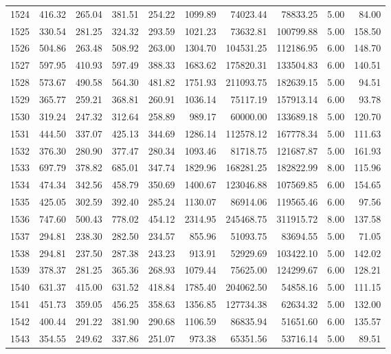 \begin{tabular}{lrrrrrrrrr}
1524 & 416.32 & 265.04 & 381.51 & 254.22 & 1099.89 & 74023.44 & 78833.25 & 5.00 & 84.00 \\
1525 & 330.54 & 281.25 & 324.32 & 293.59 & 1021.23 & 73632.81 & 100799.88 & 5.00 & 158.50 \\
1526 & 504.86 & 263.48 & 508.92 & 263.00 & 1304.70 & 104531.25 & 112186.95 & 6.00 & 148.70 \\
1527 & 597.95 & 410.93 & 597.49 & 388.33 & 1683.62 & 175820.31 & 133504.83 & 6.00 & 140.51 \\
1528 & 573.67 & 490.58 & 564.30 & 481.82 & 1751.93 & 211093.75 & 182639.15 & 5.00 & 94.51 \\
1529 & 365.77 & 259.21 & 368.81 & 260.91 & 1036.14 & 75117.19 & 157913.14 & 6.00 & 93.78 \\
1530 & 319.24 & 247.32 & 312.64 & 258.89 & 989.17 & 60000.00 & 133689.18 & 5.00 & 120.70 \\
1531 & 444.50 & 337.07 & 425.13 & 344.69 & 1286.14 & 112578.12 & 167778.34 & 5.00 & 111.63 \\
1532 & 376.30 & 280.90 & 377.47 & 280.34 & 1093.46 & 81718.75 & 121687.87 & 5.00 & 161.93 \\
1533 & 697.79 & 378.82 & 685.01 & 347.74 & 1829.96 & 168281.25 & 182822.99 & 8.00 & 115.96 \\
1534 & 474.34 & 342.56 & 458.79 & 350.69 & 1400.67 & 123046.88 & 107569.85 & 6.00 & 154.65 \\
1535 & 425.05 & 302.59 & 392.40 & 285.24 & 1130.07 & 86914.06 & 119565.46 & 6.00 & 97.56 \\
1536 & 747.60 & 500.43 & 778.02 & 454.12 & 2314.95 & 245468.75 & 311915.72 & 8.00 & 137.58 \\
1537 & 294.81 & 238.30 & 282.50 & 234.57 & 855.96 & 51093.75 & 83694.55 & 5.00 & 71.05 \\
1538 & 294.81 & 237.50 & 287.38 & 243.23 & 913.91 & 52929.69 & 103422.10 & 5.00 & 142.02 \\
1539 & 378.37 & 281.25 & 365.36 & 268.93 & 1079.44 & 75625.00 & 124299.67 & 6.00 & 128.21 \\
1540 & 631.37 & 415.00 & 631.52 & 418.84 & 1785.40 & 204062.50 & 54858.16 & 5.00 & 111.15 \\
1541 & 451.73 & 359.05 & 456.25 & 358.63 & 1356.85 & 127734.38 & 62634.32 & 5.00 & 132.00 \\
1542 & 400.44 & 291.22 & 381.90 & 290.68 & 1106.59 & 86835.94 & 51651.60 & 6.00 & 135.57 \\
1543 & 354.55 & 249.62 & 337.86 & 251.07 & 973.38 & 65351.56 & 53716.14 & 5.00 & 89.51 \\

\end{tabular}
